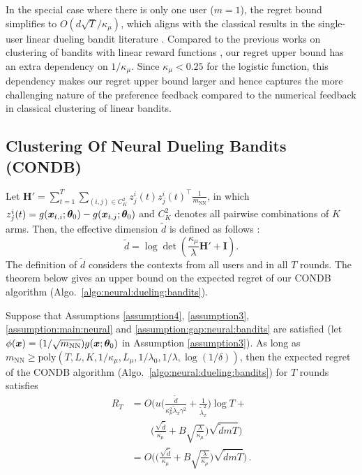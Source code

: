 In the special case where there is only one user (\(m = 1\)), the regret bound simplifies to \(O(d \sqrt{T} / \kappa_\mu)\), which aligns with the 
classical results in the single-user linear dueling bandit literature \cite{NeurIPS21_saha2021optimal,ICML22_bengs2022stochastic,arXiv24_li2024feelgood}.
Compared to the previous works on clustering of bandits with linear reward functions \cite{gentile2014online,wang2024onlinea,10.5555/3367243.3367445}, our regret upper bound has an extra dependency on $1 / \kappa_\mu$. Since $\kappa_\mu < 0.25$ for the logistic function, this dependency makes our regret upper bound larger and hence captures the more challenging nature of the preference feedback compared to the numerical feedback in classical clustering of linear bandits.

\subsection{Clustering Of Neural Dueling Bandits (CONDB)}
\label{subsec:theory:neural}
Let $\mathbf{H}' = \sum_{t=1}^T \sum_{(i, j) \in C_K^2} z^i_j(t)z^i_j(t)^\top  \frac{1}{m_{\text{NN}}}$, in which 
$z^i_j(t) = g(\boldsymbol{x}_{t,i};\boldsymbol{\theta}_0) - g(\boldsymbol{x}_{t,j};\boldsymbol{\theta}_0)$ 
and $C_K^2$ denotes all pairwise combinations of $K$ arms. 
Then, the effective dimension $\widetilde{d}$ is defined as follows \cite{verma2024neural}:
\begin{equation}
    \widetilde{d} = \log \det  \left(\frac{\kappa_\mu}{\lambda}  \mathbf{H}' + \mathbf{I}\right).
\label{eq:eff:dimension}
\end{equation}
The definition of $\widetilde{d}$ considers the contexts from all users and in all $T$ rounds.
The theorem below gives an upper bound on the expected regret of our CONDB algorithm (Algo.~\ref{algo:neural:dueling:bandits}).
\begin{theorem} \label{thm: neural regret bound}
Suppose that Assumptions \ref{assumption4}, \ref{assumption3}, \ref{assumption:main:neural} and \ref{assumption:gap:neural:bandits} are satisfied (let $\phi(\boldsymbol{x}) = (1 / \sqrt{m_{\text{NN}}})g(\boldsymbol{x};\boldsymbol{\theta}_0)$ in Assumption \ref{assumption3}). 
As long as $m_{\text{NN}} \geq \text{poly}(T, L, K, 1/\kappa_\mu, L_\mu, 1/\lambda_0, 1/\lambda, \log(1/\delta))$,
then the expected regret of the CONDB algorithm (Algo.~\ref{algo:neural:dueling:bandits}) for $T$ rounds satisfies
\begin{align}
R_T &= O\bigg(u\big(\frac{\widetilde{d}}{\kappa_\mu^2\tilde\lambda_x \gamma^2}+\frac{1}{\tilde\lambda_x^2}\big)\log T+\nonumber\\
&\qquad \big(\frac{\sqrt{\widetilde{d}}}{\kappa_\mu} + B\sqrt{\frac{\lambda}{\kappa_\mu}}\big)\sqrt{\widetilde{d}mT} \bigg) \label{regret:bound:condb}\\
&=O\Big(\big(\frac{\sqrt{\widetilde{d}}}{\kappa_\mu} + B\sqrt{\frac{\lambda}{\kappa_\mu}}\big)\sqrt{\widetilde{d}mT} \Big)\,.\label{regret:bound:condb:second}
\end{align}
\end{theorem}
